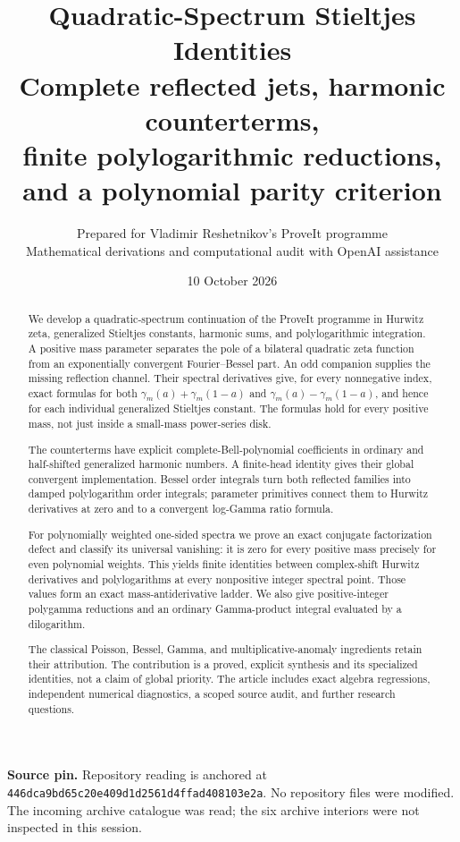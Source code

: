 \documentclass[11pt,letterpaper]{article}
\title{\textbf{Quadratic-Spectrum Stieltjes Identities}\\[7pt]
\large Complete reflected jets, harmonic counterterms,\\
finite polylogarithmic reductions, and a polynomial parity criterion}
\author{Prepared for Vladimir Reshetnikov's ProveIt programme\\
\small Mathematical derivations and computational audit with OpenAI assistance}
\date{10 October 2026}
\numberwithin{equation}{section}
\theoremstyle{definition}
\newcommand{\qpin}{\nolinkurl{446dca9bd65c20e409d1d2561d4ffad408103e2a}}
\begin{document}
\maketitle
\thispagestyle{plain}
\begin{abstract}
We develop a quadratic-spectrum continuation of the ProveIt programme in
Hurwitz zeta, generalized Stieltjes constants, harmonic sums, and polylogarithmic
integration. A positive mass parameter separates the pole of a bilateral
quadratic zeta function from an exponentially convergent Fourier--Bessel
part. An odd companion supplies the missing reflection channel. Their
spectral derivatives give, for every nonnegative index, exact formulas for
both $\gamma_m(a)+\gamma_m(1-a)$ and $\gamma_m(a)-\gamma_m(1-a)$, and hence
for each individual generalized Stieltjes constant. The formulas hold for
every positive mass, not just inside a small-mass power-series disk.

The counterterms have explicit complete-Bell-polynomial coefficients in
ordinary and half-shifted generalized harmonic numbers. A finite-head
identity gives their global convergent implementation. Bessel order
integrals turn both reflected families into damped polylogarithm order
integrals; parameter primitives connect them to Hurwitz derivatives at
zero and to a convergent log-Gamma ratio formula.

For polynomially weighted one-sided spectra we prove an exact conjugate
factorization defect and classify its universal vanishing: it is zero for
every positive mass precisely for even polynomial weights. This yields
finite identities between complex-shift Hurwitz derivatives and
polylogarithms at every nonpositive integer spectral point. Those values
form an exact mass-antiderivative ladder. We also give positive-integer
polygamma reductions and an ordinary Gamma-product integral evaluated by
a dilogarithm.

The classical Poisson, Bessel, Gamma, and multiplicative-anomaly ingredients
retain their attribution. The contribution is a proved, explicit synthesis
and its specialized identities, not a claim of global priority. The
article includes exact algebra regressions, independent numerical
diagnostics, a scoped source audit, and further research questions.
\end{abstract}
\medskip
\noindent\textbf{Source pin.} Repository reading is anchored at \qpin.
No repository files were modified. The incoming archive catalogue was read;
the six archive interiors were not inspected in this session.
\clearpage
\begingroup\small\tableofcontents\endgroup
\clearpage








\end{document}
